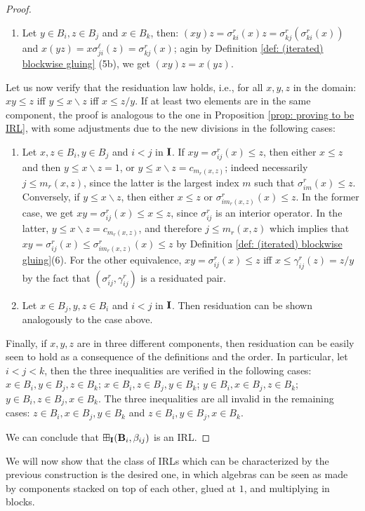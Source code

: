 \documentclass{amsart}
\theoremstyle{definition}
\numberwithin{equation}{section}
\newcommand{\alg}[1]{{\textbf{\upshape #1}}}  %
\newcommand{\Sellx}[3]{\sigma^\ell_{#1#2}(#3)}
\newcommand{\Srx}[3]{\sigma^r_{#1#2}(#3)}
\newcommand{\Grx}[3]{\gamma^r_{#1#2}(#3)}
\newcommand{\betaij}{\beta_{ij}}
\begin{document}
\begin{proof}
\begin{enumerate}
		\item Let $y \in  B_i, z \in  B_j$ and $x \in B_k$, then: 
		 $(xy)z=\Srx k i x z=\Srx k j {\Srx k i x}$ and $x(yz)=x \Sellx j i z= \Srx k j x$; agin by Definition \ref{def: (iterated) blockwise gluing} (5b), we get $(xy)z=x(yz)$.
\end{enumerate} 
				Let us now verify that the residuation law holds, i.e., for all $x,y,z$ in the domain: $xy \leq z$ iff $y \leq x \backslash z$ iff $x \leq z/y$. If at least two elements are in the same component, the proof is analogous to the one in Proposition \ref{prop: proving to be IRL}, with some adjustments due to the new divisions in the following cases: 
		\begin{enumerate}
			\item Let $x,z \in B_i, y \in B_j$ and $i < j$ in $\alg I$. If $xy = \Srx i j x \leq z$, then either $x \leq z$ and then $y \leq x \backslash z = 1$, or $y \leq x \backslash z = c_{m_r(x,z)}$; indeed necessarily $j \leq m_r(x,z)$, since the latter is the largest index $m$ such that $\Srx i m x \leq z$. Conversely, if $y \leq x \backslash z$, then either $x \leq z$ or $\Srx i {m_r(x,z)} x \leq z$. In the former case, we get $xy = \Srx i j x \leq x \leq z$, since $\sigma^r_{ij}$ is an interior operator. In the latter, $y \leq x \backslash z = c_{m_r(x,z)}$, and therefore $j \leq m_r(x,z)$ which implies that $xy = \Srx i j x \leq \Srx i {m_r(x,z)} x \leq z$ by Definition \ref{def: (iterated) blockwise gluing}(6). For the other equivalence, $xy = \Srx i j x \leq z$ iff $x \leq \Grx{i}{j}{z} = z / y$ by the fact that $(\sigma^r_{ij}, \gamma^r_{ij})$ is a residuated pair.
			\item Let $x \in B_j, y,z \in B_i$ and $i < j$ in $\alg I$. Then residuation can be shown analogously to the case above.
		\end{enumerate}
		Finally, if $x,y,z$ are in three different components, then residuation can be easily seen to hold as a consequence of the definitions and the order. In particular, let $i < j < k$, then the three inequalities are verified in the following cases: $x \in B_i, y \in B_j, z \in B_k$; $x \in B_i, z \in B_j, y \in B_k$; $y \in B_i, x \in B_j, z \in B_k$; $y \in B_i,z \in B_j, x \in B_k$. The three inequalities are all invalid in the remaining cases: $ z \in B_i, x \in B_j, y \in B_k$ and $z \in B_i, y \in B_j, x \in B_k$. 
		
		
		We can conclude that $\boxplus_{\bf I} (\alg B_i, \betaij)$ is an IRL.
\end{proof}
We will now show that the class of IRLs which can be characterized by the previous construction is the desired one, in which algebras can be seen as made by components stacked on top of each other, glued at $1$, and multiplying in blocks.
\end{document}
